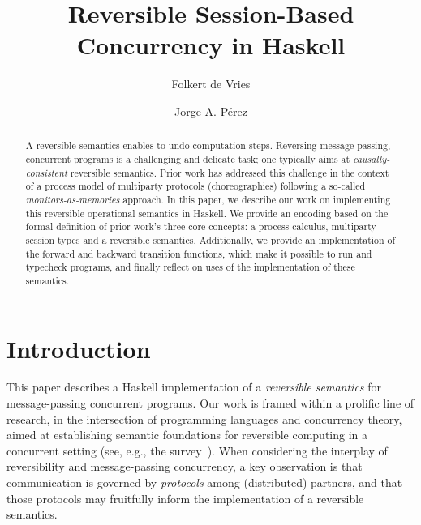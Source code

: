 \documentclass[runningheads,plain]{llncs}
\begin{document}
\title{Reversible Session-Based Concurrency in Haskell}

\author{Folkert de Vries \and
Jorge A. P\'{e}rez%
}
%
%
\maketitle



\begin{abstract}
A reversible semantics enables to undo computation steps. 
Reversing  
message-passing, concurrent programs is a
challenging and delicate task; one typically aims at 
\emph{causally-consistent} reversible semantics.
Prior work has addressed this
challenge in the context of a process model of multiparty protocols
(choreographies) following a so-called \emph{monitors-as-memories}
approach. In this paper, we describe our work on implementing
this reversible operational semantics in Haskell. 
We provide an encoding based on
the formal definition of prior work's three core concepts: a process
calculus, multiparty session types and a reversible semantics.
Additionally, we provide an implementation of the forward and backward
transition functions, which make it possible to run and typecheck
programs, and finally reflect on uses of the implementation of these
semantics. 
\end{abstract}





\section{Introduction}
This paper describes a Haskell implementation of 
a \emph{reversible semantics} for message-passing concurrent programs. 
Our work is framed within a prolific line of research, 
in the intersection of programming languages and concurrency theory,
aimed at establishing  semantic foundations for reversible computing in a 
concurrent setting (see, e.g., the survey~\cite{DBLP:journals/eatcs/Lanese14}).
When considering the interplay of reversibility and message-passing concurrency, 
a key observation  is that
 communication is governed by
\emph{protocols} among  (distributed) partners, and that 
 those protocols may fruitfully inform the implementation of a reversible semantics.
\end{document}
